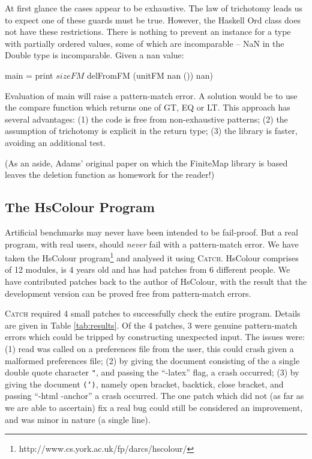 \documentclass[preprint]{sigplanconf}
\newcommand{\T}[1]{\texttt{#1}}
\newcommand{\C}[1]{\textsf{#1}}
\newcommand{\catch}{\textsc{Catch}}
\newcommand{\newtool}{\anon{\catch07}{\catch}}
\newcommand{\anon}[2]{#2}
\begin{document}
At first glance the cases appear to be exhaustive. The law of trichotomy leads us to expect one of these guards must be true. However, the Haskell \C{Ord} class does not have these restrictions. There is nothing to prevent an instance for a type with partially ordered values, some of which are incomparable -- NaN in the \C{Double} type is incomparable. Given a \C{nan} value:

\begin{code}
main = print $ sizeFM $ delFromFM (unitFM nan ()) nan)
\end{code}

\noindent Evaluation of \C{main} will raise a pattern-match error. A solution would be to use the \C{compare} function which returns one of \C{GT}, \C{EQ} or \C{LT}. This approach has several advantages: (1) the code is free from non-exhaustive patterns; (2) the assumption of trichotomy is explicit in the return type; (3) the library is faster, avoiding an additional test.

(As an aside, Adams' original paper on which the FiniteMap library is based leaves the deletion function as homework for the reader!)


\subsection{The HsColour Program}
\label{sec:hscolour}

Artificial benchmarks may never have been intended to be fail-proof. But a real program, with real users, should \textit{never} fail with a pattern-match error. We have taken the HsColour program\footnote{http://www.cs.york.ac.uk/fp/darcs/hscolour/} and analysed it using \newtool{}. HsColour comprises of 12 modules, is 4 years old and has had patches from 6 different people.
We have contributed patches back to the author of HsColour, with the result that the development version can be proved free from pattern-match errors.

\catch{} required 4 small patches to successfully check the entire program. Details are given in Table \ref{tab:results}. Of the 4 patches, 3 were genuine pattern-match errors which could be tripped by constructing unexpected input. The issues were: (1) \C{read} was called on a preferences file from the user, this could crash given a malformed preferences file; (2) by giving the document consisting of the a single double quote character \T{"}, and passing the ``-latex'' flag, a crash occurred; (3) by giving the document \T{(`)}, namely open bracket, backtick, close bracket, and passing ``-html -anchor'' a crash occurred. The one patch which did not (as far as we are able to ascertain) fix a real bug could still be considered an improvement, and was minor in nature (a single line).
\end{document}
